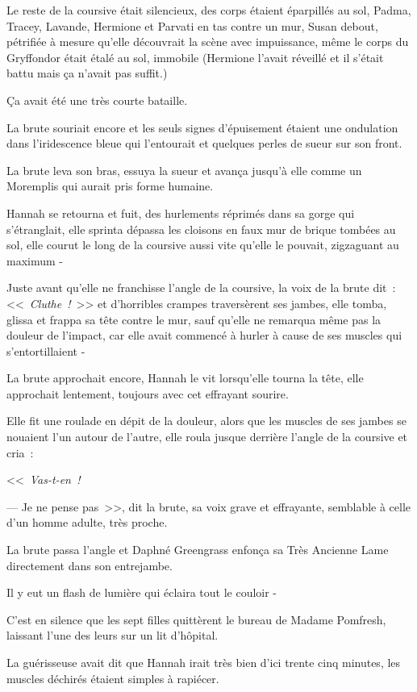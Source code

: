 Le reste de la coursive était silencieux, des corps étaient éparpillés au sol, Padma, Tracey, Lavande, Hermione et Parvati en tas contre un mur, Susan debout, pétrifiée à mesure qu'elle découvrait la scène avec impuissance, même le corps du Gryffondor était étalé au sol, immobile (Hermione l'avait réveillé et il s'était battu mais ça n'avait pas suffit.)

Ça avait été une très courte bataille.

La brute souriait encore et les seuls signes d'épuisement étaient une ondulation dans l'iridescence bleue qui l'entourait et quelques perles de sueur sur son front.

La brute leva son bras, essuya la sueur et avança jusqu'à elle comme un Moremplis qui aurait pris forme humaine.

Hannah se retourna et fuit, des hurlements réprimés dans sa gorge qui s'étranglait, elle sprinta dépassa les cloisons en faux mur de brique tombées au sol, elle courut le long de la coursive aussi vite qu'elle le pouvait, zigzaguant au maximum -

Juste avant qu'elle ne franchisse l'angle de la coursive, la voix de la brute dit~: <<~\emph{Cluthe~!}~>> et d'horribles crampes traversèrent ses jambes, elle tomba, glissa et frappa sa tête contre le mur, sauf qu'elle ne remarqua même pas la douleur de l'impact, car elle avait commencé à hurler à cause de ses muscles qui s'entortillaient -

La brute approchait encore, Hannah le vit lorsqu'elle tourna la tête, elle approchait lentement, toujours avec cet effrayant sourire.

Elle fit une roulade en dépit de la douleur, alors que les muscles de ses jambes se nouaient l'un autour de l'autre, elle roula jusque derrière l'angle de la coursive et cria~:

<<~\emph{Vas-t-en~!}

--- Je ne pense pas~>>, dit la brute, sa voix grave et effrayante, semblable à celle d'un homme adulte, très proche.

La brute passa l'angle et Daphné Greengrass enfonça sa Très Ancienne Lame directement dans son entrejambe.

Il y eut un flash de lumière qui éclaira tout le couloir -

\later

C'est en silence que les sept filles quittèrent le bureau de Madame Pomfresh, laissant l'une des leurs sur un lit d'hôpital.

La guérisseuse avait dit que Hannah irait très bien d'ici trente cinq minutes, les muscles déchirés étaient simples à rapiécer.

